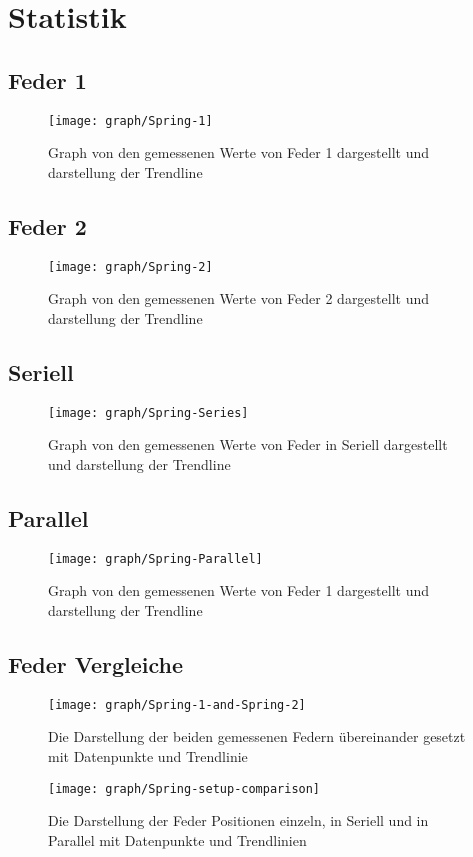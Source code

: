 \documentclass[../main.tex]{subfiles} %
\begin{document}
\section{Statistik}\label{sec:statistik}
\subsection{Feder 1}\label{subsec:statik-feder-1}
\begin{figure}[H]
    \centering
    \texttt{[image: graph/Spring-1]}
    \caption{Graph von den gemessenen Werte von Feder 1 dargestellt und darstellung der Trendline}
    \label{fig:graph-spring-1}
\end{figure}
\subsection{Feder 2}\label{subsec:statik-feder-2}
\begin{figure}[H]
    \centering
    \texttt{[image: graph/Spring-2]}
    \caption{Graph von den gemessenen Werte von Feder 2 dargestellt und darstellung der Trendline}
    \label{fig:graph-spring-2}
\end{figure}
\subsection{Seriell}\label{subsec:statik-spring-series}
\begin{figure}[H]
    \centering
    \texttt{[image: graph/Spring-Series]}
    \caption{Graph von den gemessenen Werte von Feder in Seriell dargestellt und darstellung der Trendline}
    \label{fig:graph-spring-series}
\end{figure}
\subsection{Parallel}\label{subsec:statik-spring-parallel}
\begin{figure}[H]
    \centering
    \texttt{[image: graph/Spring-Parallel]}
    \caption{Graph von den gemessenen Werte von Feder 1 dargestellt und darstellung der Trendline}
    \label{fig:graph-spring-parallel}
\end{figure}
\subsection{Feder Vergleiche}\label{subsec:statik-spring-comparisons}
\begin{figure}[H]
    \centering
    \texttt{[image: graph/Spring-1-and-Spring-2]}
    \caption{Die Darstellung der beiden gemessenen Federn übereinander gesetzt mit Datenpunkte und Trendlinie}
    \label{fig:graph-single-spring-comparisons}
\end{figure}
\begin{figure}[H]
    \centering
    \texttt{[image: graph/Spring-setup-comparison]}
    \caption{Die Darstellung der Feder Positionen einzeln, in Seriell und in Parallel mit Datenpunkte und Trendlinien}
    \label{fig:graph-spring-setup-comparisons}
\end{figure}
\end{document}
